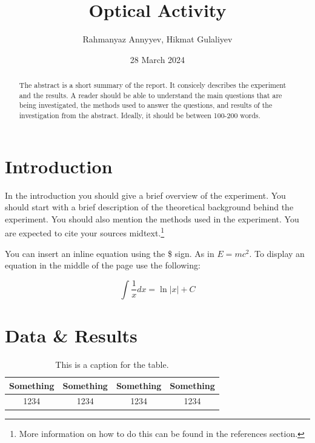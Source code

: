 \documentclass[10pt]{article}
\title{Optical Activity} %
\author{Rahmanyaz Annyyev, Hikmat Gulaliyev} %
\date{28 March 2024} %
\begin{document}
\maketitle

\begin{abstract}
The abstract is a short summary of the report. It consicely describes the experiment and the results. A reader should be able to understand the main questions that are being investigated, the methods used to answer the questions, and results of the investigation from the abstract. Ideally, it should be between 100-200 words.

\end{abstract}

\section{Introduction}

In the introduction you should give a brief overview of the experiment. You should start with a brief description of the theoretical background behind the experiment. You should also mention the methods used in the experiment. You are expected to cite your sources\cite{Bravyi_2020} midtext.\footnote{More information on how to do this can be found in the references section.}


You can insert an inline equation using the \$ sign. As in $E=mc^2$. To display an equation in the middle of the page use the following:

\begin{equation}
    \int \frac{1}{x} dx = \ln|x| + C
\end{equation}

\section{Data \& Results}

\begin{table}[ht]
    \centering
    \begin{tabular}{|c|c|c|c|}
        \hline
        Something & Something & Something & Something \\
        \hline
        1234 & 1234 & 1234 & 1234 \\
        \hline
    \end{tabular}
    \caption{This is a caption for the table.}
    \label{tab:ex}
\end{table}
\end{document}
